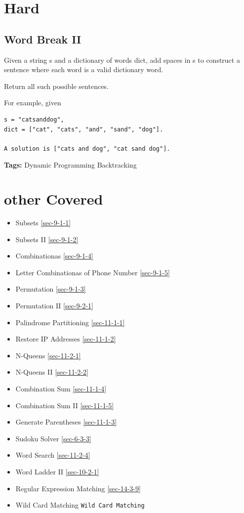 \documentclass[12pt]{book}
\begin{document}
\section{Hard}
\label{sec-16-2}
\subsection{Word Break II}
\label{sec-16-2-1}
Given a string s and a dictionary of words dict, add spaces in s to construct a sentence where each word is a valid dictionary word.

Return all such possible sentences.

For example, given
\lstset{language=java,label= ,caption= ,numbers=none}
\begin{lstlisting}
s = "catsanddog",
dict = ["cat", "cats", "and", "sand", "dog"].

A solution is ["cats and dog", "cat sand dog"].
\end{lstlisting}
\textbf{Tags:} Dynamic Programming Backtracking
\section{other Covered}
\label{sec-16-3}
\begin{itemize}
\item Subsets
\ref{sec-9-1-1}
\item Subsets II
\ref{sec-9-1-2}
\item Combinationas
\ref{sec-9-1-4}
\item Letter Combinationas of Phone Number
\ref{sec-9-1-5}
\item Permutation
\ref{sec-9-1-3}
\item Permutation II
\ref{sec-9-2-1}
\item Palindrome Partitioning 
\ref{sec-11-1-1}
\item Restore IP Addresses
\ref{sec-11-1-2}
\item N-Queens 
\ref{sec-11-2-1}
\item N-Queens II
\ref{sec-11-2-2}
\item Combination Sum
\ref{sec-11-1-4}
\item Combination Sum II
\ref{sec-11-1-5}
\item Generate Parentheses
\ref{sec-11-1-3}
\item Sudoku Solver
\ref{sec-6-3-3}
\item Word Search
\ref{sec-11-2-4}
\item Word Ladder II
\ref{sec-10-2-1}
\item Regular Expression Matching
\ref{sec-14-3-9}
\item Wild Card Matching
\texttt{Wild Card Matching}
\end{itemize}
\end{document}
